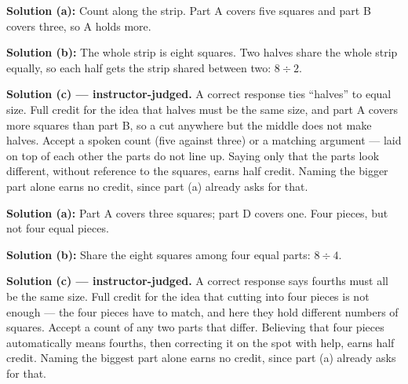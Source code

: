 \documentclass[12pt]{article}
\begin{document}




\textbf{Solution (a):} Count along the strip. Part A covers five squares and part B covers three, so A holds more. 

\textbf{Solution (b):} The whole strip is eight squares. Two halves share the whole strip equally, so each half gets the strip shared between two: $8 \div 2$. 

\textbf{Solution (c) --- instructor-judged.} A correct response ties ``halves'' to equal size. Full credit for the idea that halves must be the same size, and part A covers more squares than part B, so a cut anywhere but the middle does not make halves. Accept a spoken count (five against three) or a matching argument --- laid on top of each other the parts do not line up. Saying only that the parts look different, without reference to the squares, earns half credit. Naming the bigger part alone earns no credit, since part (a) already asks for that.


\textbf{Solution (a):} Part A covers three squares; part D covers one. Four pieces, but not four equal pieces. 

\textbf{Solution (b):} Share the eight squares among four equal parts: $8 \div 4$. 

\textbf{Solution (c) --- instructor-judged.} A correct response says fourths must all be the same size. Full credit for the idea that cutting into four pieces is not enough --- the four pieces have to match, and here they hold different numbers of squares. Accept a count of any two parts that differ. Believing that four pieces automatically means fourths, then correcting it on the spot with help, earns half credit. Naming the biggest part alone earns no credit, since part (a) already asks for that.

\end{document}
